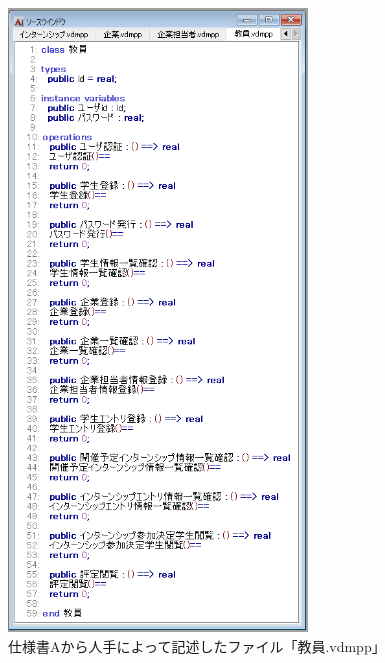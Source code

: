 \begin{figure}[tp]
    \begin{center}
    \includegraphics[width=300]{image/speA_vdm6.PNG}
    \caption{仕様書Aから人手によって記述したファイル「教員.vdmpp」}
    \label{fig:speA_vdm6}
    \end{center}
\end{figure}

